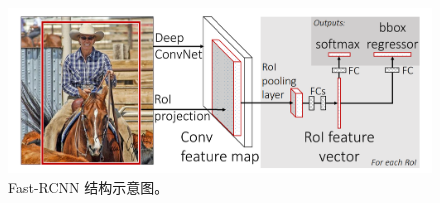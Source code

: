 \begin{figure}[!t]
	\centering
	\includegraphics[width=\textwidth]{./imgs/fast-rcnn.png}
	\caption{Fast-RCNN 结构示意图。}
	\label{fig:fast-rcnn}
\end{figure}
